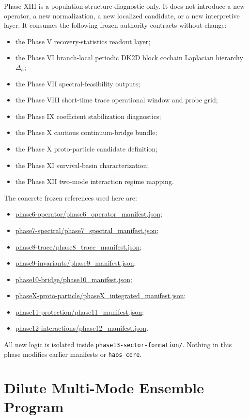 \documentclass[11pt]{article}
\begin{document}
Phase XIII is a population-structure diagnostic only. It does not introduce a new operator, a new normalization, a new localized candidate, or a new interpretive layer. It consumes the following frozen authority contracts without change:
\begin{itemize}
\item the Phase V recovery-statistics readout layer;
\item the Phase VI branch-local periodic DK2D block cochain Laplacian hierarchy $\Delta_h$;
\item the Phase VII spectral-feasibility outputs;
\item the Phase VIII short-time trace operational window and probe grid;
\item the Phase IX coefficient stabilization diagnostics;
\item the Phase X cautious continuum-bridge bundle;
\item the Phase X proto-particle candidate definition;
\item the Phase XI survival-basin characterization;
\item the Phase XII two-mode interaction regime mapping.
\end{itemize}

The concrete frozen references used here are:
\begin{itemize}
\item \url{phase6-operator/phase6_operator_manifest.json};
\item \url{phase7-spectral/phase7_spectral_manifest.json};
\item \url{phase8-trace/phase8_trace_manifest.json};
\item \url{phase9-invariants/phase9_manifest.json};
\item \url{phase10-bridge/phase10_manifest.json};
\item \url{phaseX-proto-particle/phaseX_integrated_manifest.json};
\item \url{phase11-protection/phase11_manifest.json};
\item \url{phase12-interactions/phase12_manifest.json}.
\end{itemize}

All new logic is isolated inside \texttt{phase13-sector-formation/}. Nothing in this phase modifies earlier manifests or \texttt{haos\_core}.

\section{Dilute Multi-Mode Ensemble Program}
\end{document}
